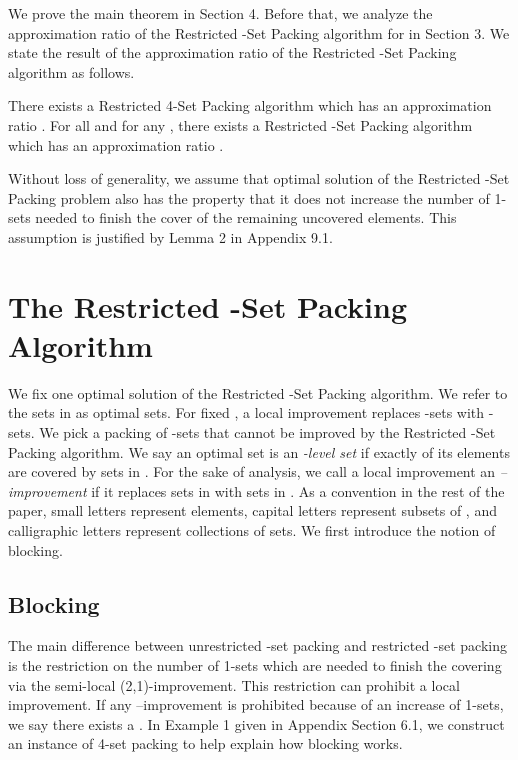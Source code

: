 \documentclass[runningheads,a4paper]{llncs}
\numberwithin{equation}{section}
\begin{document}
We prove the main theorem in Section 4. Before that, we analyze the approximation ratio of the Restricted -Set Packing algorithm for  in Section 3. We state the result of the approximation ratio of the Restricted -Set Packing algorithm as follows.

\begin{theorem}
There exists a Restricted 4-Set Packing algorithm which has an approximation ratio . For all  and for any , there exists a Restricted -Set Packing algorithm which has an approximation ratio .
\end{theorem}

\begin{remark}
Without loss of generality, we assume that optimal solution of the Restricted -Set Packing problem also has the property that it does not increase the number of 1-sets needed to finish the cover of the remaining uncovered elements. This assumption is justified by Lemma 2 in Appendix 9.1.
\end{remark}

\section{The Restricted -Set Packing Algorithm}

We fix one optimal solution  of the Restricted -Set Packing algorithm. We refer to the sets in  as optimal sets. For fixed , a local improvement replaces  -sets with  -sets. We pick a packing of -sets  that cannot be improved by the Restricted -Set Packing algorithm. We say an optimal set is an \emph{-level set} if exactly  of its elements are covered by sets in . For the sake of analysis, we call a local improvement an \emph{--improvement} if it replaces  sets in  with  sets in . As a convention in the rest of the paper, small letters represent elements, capital letters represent subsets of , and calligraphic letters represent collections of sets. We first introduce the notion of blocking.

\subsection{Blocking}

The main difference between unrestricted -set packing and restricted -set packing is the restriction on the number of 1-sets which are needed to finish the covering via the semi-local (2,1)-improvement. This restriction can prohibit a local improvement. If any --improvement is prohibited because of an increase of 1-sets, we say there exists a . In Example 1 given in Appendix Section 6.1, we construct an instance of 4-set packing to help explain how blocking works.
\end{document}
